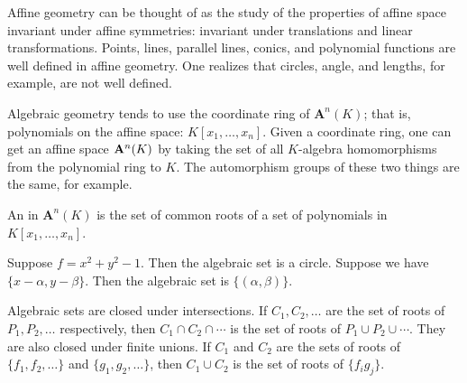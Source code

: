 \documentclass[11pt, oneside,margin=1in]{article}
\begin{document}

Affine geometry can be thought of as the study of the properties of affine space invariant under affine symmetries: invariant under translations and linear transformations. Points, lines, parallel lines, conics, and polynomial functions are well defined in affine geometry. One realizes that circles, angle, and lengths, for example, are not well defined.

Algebraic geometry tends to use the coordinate ring of $\mathbf{A}^n(K)$; that is, polynomials on the affine space: $K[x_1,\hdots, x_n]$. Given a coordinate ring, one can get an affine space $\mathbf{A}^n(K)$ by taking the set of all $K$-algebra homomorphisms from the polynomial ring to $K$. The automorphism groups of these two things are the same, for example.

\begin{definition}\label{}\text{}
An  in $\mathbf{A}^n(K)$ is the set of common roots of a set of polynomials in $K[x_1,\hdots, x_n]$.
\end{definition}

\begin{example}[ ]\label{}\text{}
Suppose $f=x^2+y^2-1$. Then the algebraic set is a circle. Suppose we have $\{x-\alpha,y-\beta\}$. Then the algebraic set is $\{(\alpha,\beta)\}$.
\end{example}

Algebraic sets are closed under intersections. If $C_1,C_2,\hdots $ are the set of roots of $P_1,P_2,\hdots$ respectively, then $C_1\cap C_2\cap \cdots $ is the set of roots of $P_1\cup P_2\cup \cdots$. They are also closed under finite unions. If $C_1$ and $C_2$ are the sets of roots of $\{f_1,f_2,\hdots\}$ and $\{g_1,g_2,\hdots\}$, then $C_1\cup C_2$ is the set of roots of $\{f_ig_j\}$.
\end{document}
